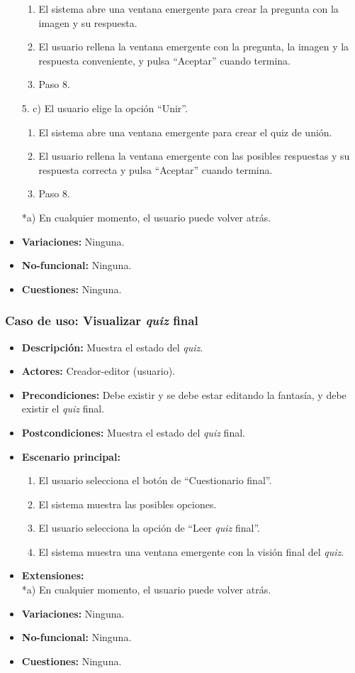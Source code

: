 \begin{itemize}
\begin{enumerate}
		\item El sistema abre una ventana emergente para crear la pregunta con la imagen y su respuesta.
		\item El usuario rellena la ventana emergente con la pregunta, la imagen y la respuesta conveniente, y pulsa ``Aceptar'' cuando termina.
		\item Paso 8.
	\end{enumerate}
	5. c) El usuario elige la opción ``Unir''.
	\begin{enumerate}
		\item El sistema abre una ventana emergente para crear el quiz de unión.
		\item El usuario rellena la ventana emergente con las posibles respuestas y su respuesta correcta y pulsa ``Aceptar'' cuando termina.
		\item Paso 8.
	\end{enumerate}
	*a) En cualquier momento, el usuario puede volver atrás.
	\item \textbf{Variaciones:} Ninguna.
	\item \textbf{No-funcional:} Ninguna.
	\item \textbf{Cuestiones:} Ninguna.
\end{itemize}

\subsubsection{Caso de uso: Visualizar \textit{quiz} final}
\begin{itemize}
	\item \textbf{Descripción:} Muestra el estado del \textit{quiz}.
	\item \textbf{Actores:} Creador-editor (usuario).
	\item \textbf{Precondiciones:} Debe existir y se debe estar editando la fantasía, y debe existir el \textit{quiz} final.
	\item \textbf{Postcondiciones:} Muestra el estado del \textit{quiz} final.
	\item \textbf{Escenario principal:}
	\begin{enumerate}
		\item El usuario selecciona el botón de ``Cuestionario final''.
		\item El sistema muestra las posibles opciones.
		\item El usuario selecciona la opción de ``Leer \textit{quiz} final''.
		\item El sistema muestra una ventana emergente con la visión final del \textit{quiz}.
	\end{enumerate}
	\item \textbf{Extensiones:} \\ *a) En cualquier momento, el usuario puede volver atrás.
	\item \textbf{Variaciones:} Ninguna.
	\item \textbf{No-funcional:} Ninguna.
	\item \textbf{Cuestiones:} Ninguna.
\end{itemize}


